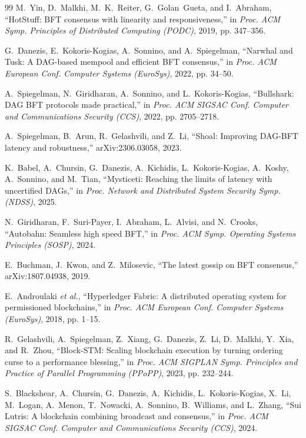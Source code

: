 \documentclass[journal]{IEEEtran}
\begin{document}
\begin{thebibliography}{99}
 M.~Yin, D.~Malkhi, M.~K.~Reiter, G.~Golan~Gueta, and I.~Abraham,
``HotStuff: BFT consensus with linearity and responsiveness,'' in \emph{Proc. ACM Symp.
Principles of Distributed Computing (PODC)}, 2019, pp. 347--356.

 G.~Danezis, E.~Kokoris-Kogias, A.~Sonnino, and A.~Spiegelman, ``Narwhal and
Tusk: A DAG-based mempool and efficient BFT consensus,'' in \emph{Proc. ACM European Conf.
Computer Systems (EuroSys)}, 2022, pp. 34--50.

 A.~Spiegelman, N.~Giridharan, A.~Sonnino, and L.~Kokoris-Kogias,
``Bullshark: DAG BFT protocols made practical,'' in \emph{Proc. ACM SIGSAC Conf. Computer and
Communications Security (CCS)}, 2022, pp. 2705--2718.

 A.~Spiegelman, B.~Arun, R.~Gelashvili, and Z.~Li, ``Shoal: Improving DAG-BFT
latency and robustness,'' arXiv:2306.03058, 2023.

 K.~Babel, A.~Chursin, G.~Danezis, A.~Kichidis, L.~Kokoris-Kogias, A.~Koshy,
A.~Sonnino, and M.~Tian, ``Mysticeti: Reaching the limits of latency with uncertified DAGs,'' in
\emph{Proc. Network and Distributed System Security Symp. (NDSS)}, 2025.

 N.~Giridharan, F.~Suri-Payer, I.~Abraham, L.~Alvisi, and N.~Crooks,
``Autobahn: Seamless high speed BFT,'' in \emph{Proc. ACM Symp. Operating Systems Principles
(SOSP)}, 2024.

 E.~Buchman, J.~Kwon, and Z.~Milosevic, ``The latest gossip on BFT
consensus,'' arXiv:1807.04938, 2019.

 E.~Androulaki \emph{et al.}, ``Hyperledger Fabric: A distributed operating
system for permissioned blockchains,'' in \emph{Proc. ACM European Conf. Computer Systems
(EuroSys)}, 2018, pp. 1--15.

 R.~Gelashvili, A.~Spiegelman, Z.~Xiang, G.~Danezis, Z.~Li, D.~Malkhi, Y.~Xia,
and R.~Zhou, ``Block-STM: Scaling blockchain execution by turning ordering curse to a performance
blessing,'' in \emph{Proc. ACM SIGPLAN Symp. Principles and Practice of Parallel Programming
(PPoPP)}, 2023, pp. 232--244.

 S.~Blackshear, A.~Chursin, G.~Danezis, A.~Kichidis, L.~Kokoris-Kogias, X.~Li,
M.~Logan, A.~Menon, T.~Nowacki, A.~Sonnino, B.~Williams, and L.~Zhang, ``Sui Lutris: A blockchain
combining broadcast and consensus,'' in \emph{Proc. ACM SIGSAC Conf. Computer and Communications
Security (CCS)}, 2024.


\end{thebibliography}
\end{document}
